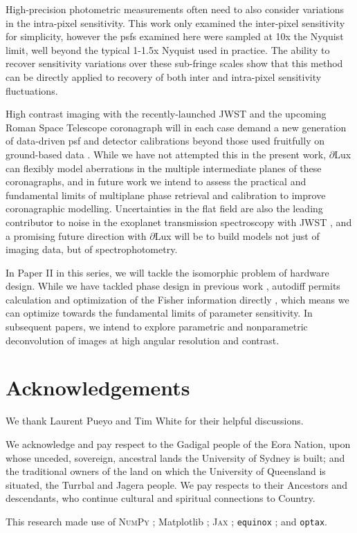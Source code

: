 \documentclass[]{spieman}
\newcommand\dlux{$\partial$Lux\xspace}
\newcommand\optax{\texttt{optax}\xspace}
\begin{document}
High-precision photometric measurements often need to also consider variations in the intra-pixel sensitivity. This work only examined the inter-pixel sensitivity for simplicity, however the \ac{psf}s examined here were sampled at 10x the Nyquist limit, well beyond the typical 1-1.5x Nyquist used in practice. The ability to recover sensitivity variations over these sub-fringe scales show that this method can be directly applied to recovery of both inter and intra-pixel sensitivity fluctuations. 


High contrast imaging with the recently-launched JWST \cite{Gardner2006} and the upcoming Roman Space Telescope coronagraph \cite{Zellem2022} will in each case demand a new generation of data-driven \ac{psf} and detector calibrations beyond those used fruitfully on ground-based data \cite{Cantalloube2021}. While we have not attempted this in the present work, \dlux can flexibly model aberrations in the multiple intermediate planes of these coronagraphs, and in future work we intend to assess the practical and fundamental limits of multiplane phase retrieval and calibration to improve coronagraphic modelling.
Uncertainties in the flat field are also the leading contributor to noise in the exoplanet transmission spectroscopy with JWST \cite{Rustamkulov2022}, and a promising future direction with \dlux will be to build models not just of imaging data, but of spectrophotometry.

In Paper II in this series, we will tackle the isomorphic problem of hardware design. While we have tackled phase design in previous work \cite{phase_ret_and_design}, autodiff permits calculation and optimization of the Fisher information directly \cite{Coe2009}, which means we can optimize towards the fundamental limits of parameter sensitivity. In subsequent papers, we intend to explore parametric and nonparametric deconvolution of images at high angular resolution and contrast.


\section{Acknowledgements}

We thank Laurent Pueyo and Tim White for their helpful discussions.

We acknowledge and pay respect to the Gadigal people of the Eora Nation, upon whose unceded, sovereign, ancestral lands the University of Sydney is built; and the traditional owners of the land on which the University of Queensland is situated, the Turrbal and Jagera people. We pay respects to their Ancestors and descendants, who continue cultural and spiritual connections to Country. 

This research made use of \textsc{NumPy} \cite{numpy}; Matplotlib \cite{matplotlib}; \textsc{Jax} \cite{jax}; \texttt{equinox} \cite{kidger2021equinox}; and \optax \cite{optax2020github}.


\end{document}
